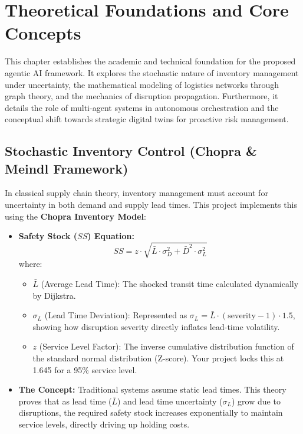 \chapter{Theoretical Foundations and Core Concepts}

This chapter establishes the academic and technical foundation for the proposed agentic AI framework. It explores the stochastic nature of inventory management under uncertainty, the mathematical modeling of logistics networks through graph theory, and the mechanics of disruption propagation. Furthermore, it details the role of multi-agent systems in autonomous orchestration and the conceptual shift towards strategic digital twins for proactive risk management.

\section{Stochastic Inventory Control (Chopra \& Meindl Framework)}
In classical supply chain theory, inventory management must account for uncertainty in both demand and supply lead times. This project implements this using the \textbf{Chopra Inventory Model}:

\begin{itemize}
    \item \textbf{Safety Stock ($SS$) Equation:}
    \[SS = z \cdot \sqrt{\bar{L} \cdot \sigma_D^2 + \bar{D}^2 \cdot \sigma_L^2}\]
    where:
    \begin{itemize}
        \item $\bar{L}$ (Average Lead Time): The shocked transit time calculated dynamically by Dijkstra.
        \item $\sigma_L$ (Lead Time Deviation): Represented as $\sigma_L = \bar{L} \cdot (\text{severity} - 1) \cdot 1.5$, showing how disruption severity directly inflates lead-time volatility.
        \item $z$ (Service Level Factor): The inverse cumulative distribution function of the standard normal distribution (Z-score). Your project locks this at 1.645 for a 95\% service level.
    \end{itemize}
    \item \textbf{The Concept:} Traditional systems assume static lead times. This theory proves that as lead time ($\bar{L}$) and lead time uncertainty ($\sigma_L$) grow due to disruptions, the required safety stock increases exponentially to maintain service levels, directly driving up holding costs.
\end{itemize}

